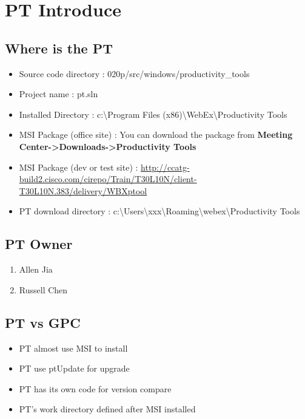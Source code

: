 \documentclass[letterpaper,10pt,english]{sphinxmanual}
\begin{document}
\chapter{PT Introduce}
\label{pt:pt-introduce}\label{pt::doc}

\section{Where is the PT}
\label{pt:where-is-the-pt}\begin{itemize}
\item {} 
Source code directory : 020p/src/windows/productivity\_tools

\item {} 
Project name : pt.sln

\item {} 
Installed Directory : c:\textbackslash{}Program Files (x86)\textbackslash{}WebEx\textbackslash{}Productivity Tools

\item {} 
MSI Package (office site) : You can download the package from \textbf{Meeting Center-\textgreater{}Downloads-\textgreater{}Productivity Tools}

\item {} 
MSI Package (dev or test site) : \href{http://ccatg-build2.cisco.com/cirepo/Train/T30L10N/client-T30L10N.383/delivery/WBXptool}{http://ccatg-build2.cisco.com/cirepo/Train/T30L10N/client-T30L10N.383/delivery/WBXptool}

\item {} 
PT download directory : c:\textbackslash{}Users\textbackslash{}xxx\textbackslash{}Roaming\textbackslash{}webex\textbackslash{}Productivity Tools

\end{itemize}


\section{PT Owner}
\label{pt:pt-owner}\begin{enumerate}
\item {} 
Allen Jia

\item {} 
Russell Chen

\end{enumerate}


\section{PT vs GPC}
\label{pt:pt-vs-gpc}\begin{itemize}
\item {} 
PT almost use MSI to install

\item {} 
PT use ptUpdate for upgrade

\item {} 
PT has its own code for version compare

\item {} 
PT's work directory defined after MSI installed

\end{itemize}
\end{document}

